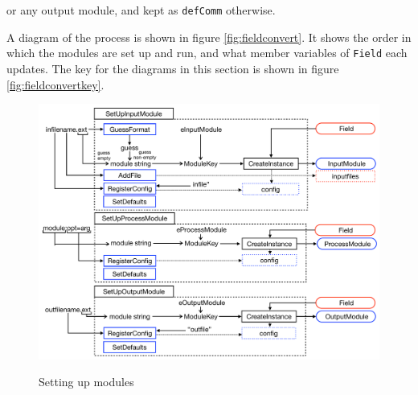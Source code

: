 or any output module, and kept as \verb+defComm+ otherwise.


A diagram of the process is shown in figure \ref{fig:fieldconvert}. It shows the order in which the modules are set up and run, and what member variables of \verb+Field+ each updates. The key for the diagrams in this section is shown in figure \ref{fig:fieldconvertkey}.


\begin{figure}[htbp]
\centering
\includegraphics[width=\linewidth]{utilities/img/SetUpModule.pdf}
\label{fig:setupmodule}
\caption{Setting up modules} 
\end{figure}

